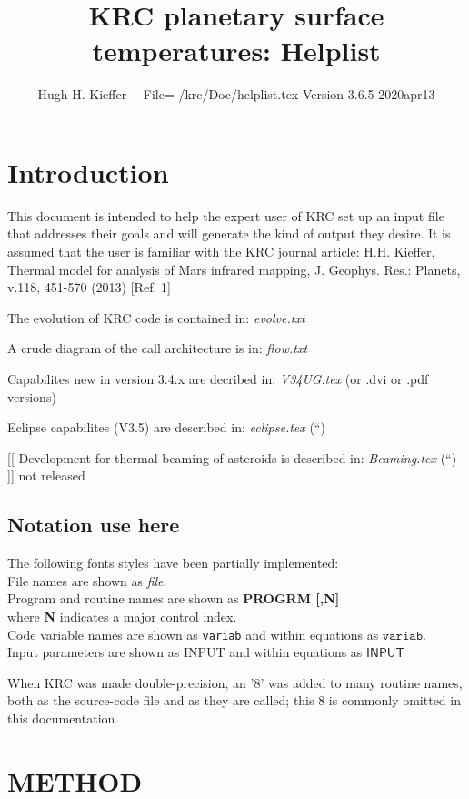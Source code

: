 \documentclass{article}
\title{KRC planetary surface temperatures: Helplist}
\author{Hugh H. Kieffer \ \ File=-/krc/Doc/helplist.tex Version 3.6.5 2020apr13}
\newcommand{\qi}{\\ \hspace*{2.em}}      %
\newcommand{\qii}{\\ \hspace*{4.em}}     %
\newcommand{\np}{\textbf}  %
\newcommand{\nf}{\textit}  %
\newcommand{\nv}{\texttt}  %
\newcommand{\nvf}{\mathtt} %
\newcommand{\nj}{\textsf}  %
\newcommand{\njf}{\mathsf} %
\begin{document}
\maketitle

\tableofcontents
 \listoftables

\section{Introduction} %

This document is intended to help the expert user of KRC set up an input file
that addresses their goals and will generate the kind of output they desire. It
is assumed that the user is familiar with the KRC journal article: H.H. Kieffer,
Thermal model for analysis of Mars infrared mapping, J. Geophys. Res.: Planets,
v.118, 451-570 (2013) [Ref. 1]

The evolution of KRC code is contained in:  \nf{evolve.txt}

A crude diagram of the call architecture is in:  \nf{flow.txt}

Capabilites new in version 3.4.x are decribed in: \nf{V34UG.tex} (or .dvi or .pdf versions)

Eclipse capabilites (V3.5) are described in: \nf{eclipse.tex}  (``)

[[ Development for thermal beaming of asteroids is described in: \nf{Beaming.tex} (``) ]] not released

\subsection{Notation use here}
The following fonts styles have been partially implemented: 
\qi File names are shown as \nf{file}. 
\qi Program and routine names are shown as \np{PROGRM [,N]} 
\qii where \np{N} indicates a major control index. 
\qi Code variable names are shown as \nv{variab} and within equations as $\nvf{variab}$.  
\qi Input parameters are shown as \nj{INPUT} and within equations as $\njf{INPUT}$

When KRC was made double-precision, an '8' was added to many routine names, both
as the source-code file and as they are called; this 8 is commonly omitted in
this documentation.

\section{METHOD}
\end{document}
